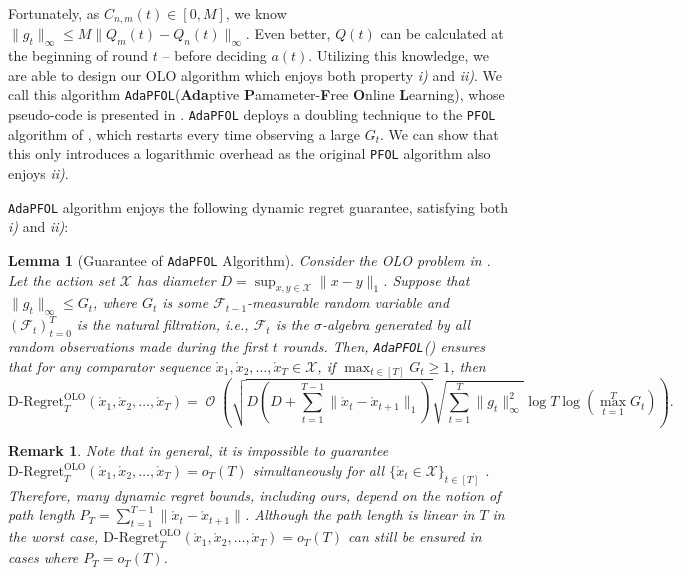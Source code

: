 \documentclass[11pt,fullpage,letterpaper]{article} %
\newtheorem{lemma}[theorem]{Lemma}
\newtheorem{remark}{Remark}
\renewcommand{\bm}[1]{#1}%
\renewcommand{\O}{\operatorname{\mathcal O}}
\newcommand{\OLOAlg}{\texttt{AdaPFOL}\xspace}
\begin{document}
Fortunately, as $C_{n,m}(t)\in [0,M]$, we know $\lVert \bm g_t\rVert_\infty \le M \lVert \bm Q_m(t) - \bm Q_n(t)\rVert_\infty$. Even better, $\bm Q(t)$ can be calculated at the beginning of round $t$ -- before deciding $\bm a(t)$.
Utilizing this knowledge, we are able to design our OLO algorithm which enjoys both property \textit{i)} and \textit{ii)}.
We call this algorithm \OLOAlg (\textbf{Ada}ptive \textbf{P}amameter-\textbf{F}ree \textbf{O}nline \textbf{L}earning), whose pseudo-code is presented in . \OLOAlg deploys a doubling technique to the \texttt{PFOL} algorithm of \citet{cutkosky2020parameter}, which restarts every time observing a large $G_t$. We can show that this only introduces a logarithmic overhead as the original \texttt{PFOL} algorithm also enjoys \textit{ii)}.

\OLOAlg algorithm enjoys the following dynamic regret guarantee, satisfying both \textit{i)} and \textit{ii)}:
\begin{lemma}[Guarantee of \OLOAlg Algorithm]\label{lem:OLO unbounded guarantee}
Consider the OLO problem in . Let the action set $\mathcal X$ has diameter $D=\sup_{\bm x,\bm y\in \mathcal X}\lVert \bm x-\bm y\rVert_1$. Suppose that $\lVert \bm g_t\rVert_\infty\le G_t$, where $G_t$ is some $\mathcal F_{t-1}$-measurable random variable and $(\mathcal F_t)_{t=0}^T$ is the natural filtration, \textit{i.e.}, $\mathcal F_t$ is the $\sigma$-algebra generated by all random observations made during the first $t$ rounds.
Then, \OLOAlg () ensures that for any comparator sequence $\mathring{\bm x}_1,\mathring{\bm x}_2,\ldots,\mathring{\bm x}_T\in \mathcal X$, if $\max_{t\in [T]} G_t\ge 1$, then
\begin{equation*}
\text{D-Regret}_T^{\text{OLO}}(\mathring{\bm x}_1,\mathring{\bm x}_2,\ldots,\mathring{\bm x}_T)=\O\left (\sqrt{D \left (D+\sum_{t=1}^{T-1} \lVert \mathring{\bm x}_t-\mathring{\bm x}_{t+1}\rVert_1\right )}\sqrt{\sum_{t=1}^T \lVert \bm g_t\rVert_\infty^2}\log T \log \left (\max_{t=1}^T G_t\right )\right ).
\end{equation*}
\end{lemma}
\begin{remark}\label{remark:dynamic regret}
Note that in general, it is impossible to guarantee $\text{D-Regret}_T^{\text{OLO}}(\mathring{\bm x}_1,\mathring{\bm x}_2,\ldots,\mathring{\bm x}_T)=o_T(T)$ simultaneously for all $\{\mathring{\bm x}_t\in \mathcal X\}_{t\in [T]}$ \citep{zinkevich2003online}.
Therefore, many dynamic regret bounds, including ours,  depend on the notion of {path length} $P_T=\sum_{t=1}^{T-1} \lVert \mathring{\bm x}_t-\mathring{\bm x}_{t+1}\rVert$. Although the path length is linear in $T$ in the worst case, $\text{D-Regret}_T^{\text{OLO}}(\mathring{\bm x}_1,\mathring{\bm x}_2,\ldots,\mathring{\bm x}_T)=o_T(T)$ can still be ensured in cases where $P_T=o_T(T)$.
\end{remark}
\end{document}
